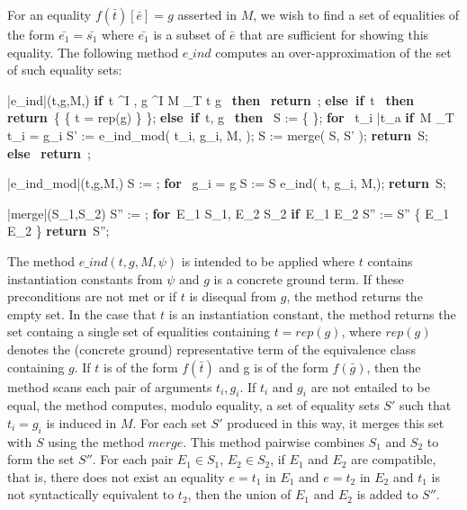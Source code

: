 \documentclass{llncs}
\def\IF{\qtab\keyword{if}\ }
\def\THEN{\ \keyword{then}\ }
\def\ELSE{\untab\qtab\keyword{else}\ }
\def\ELSEIF{\untab\qtab\keyword{else if}\ }
\def\FI{\untab}
\def\RETURN{\keyword{return}\ }
\def\ENDPROC{\untab}
\def\DOFOR{\qtab\keyword{for}\ }
\def\ENDFOR{\untab}
\def\keyword#1{\mbox{\normalshape\bf #1}}
\begin{document}
For an equality $f( \bar{t} )[\bar{e}] = g$ asserted in $M$, we wish to find a set of equalities of the form $\bar{e_1} = \bar{s_1}$ where $\bar{e_1}$ is a subset of $\bar{e}$ that are sufficient for showing this equality.
The following method $e\_ind$ computes an over-approximation of the set of such equality sets:

\begin{minipage}[t]{.4\linewidth}
\begin{program}
\PROC |e\_ind|(t,g,M,\psi) \BODY
  \IF t \not\mapsto^I \psi, g \not\mapsto^I \emptyset {} M \models_T t \neq g \THEN
    \RETURN \emptyset;
  \ELSEIF t  \THEN
    \RETURN \{ \{ t = rep(g) \} \};
  \ELSEIF t, g  \THEN
    S := \{ \emptyset \};
    \DOFOR {} t_i  \bar{t_a} 
      \IF M \not\models_T t_i = g_i
        S' := e\_ind\_mod( t_i, g_i, M, \psi );
        S := merge( S, S' );
      \FI
    \ENDFOR
    \RETURN S;
  \ELSE
    \RETURN \emptyset;
  \FI
\ENDPROC
\end{program}
\end{minipage}
\begin{minipage}[t]{.4\linewidth}
\begin{program}
\PROC |e\_ind\_mod|(t,g,M,\psi) \BODY
  S := \emptyset;
  \DOFOR {} g_i = g
    S := S \cup e\_ind( t, g_i, M,\psi );
  \ENDFOR
  \RETURN S;
\ENDPROC
\end{program}
\begin{program}
\PROC |merge|(S_1,S_2) \BODY
  S'' := \emptyset;
  \DOFOR E_1 \in S_1, E_2 \in S_2
    \IF E_1  E_2 
      S'' := S'' \cup \{ E_1 \cup E_2 \}
    \FI
  \ENDFOR
  \RETURN S'';
\ENDPROC
\end{program}
\end{minipage}

The method $e\_ind(t,g,M,\psi)$ is intended to be applied where $t$ contains instantiation constants from $\psi$ and $g$ is a concrete ground term.
If these preconditions are not met or if $t$ is disequal from $g$, the method returns the empty set.
In the case that $t$ is an instantiation constant, the method returns the set containg a single set of equalities containing $t = rep( g )$, where $rep( g )$ denotes the (concrete ground) representative term of the equivalence class containing $g$.
If $t$ is of the form $f(\bar{t})$ and g is of the form $f(\bar{g})$, then the method scans each pair of arguments $t_i, g_i$.
If $t_i$ and $g_i$ are not entailed to be equal, the method computes, modulo equality, a set of equality sets $S'$ such that $t_i = g_i$ is induced in $M$.
For each set $S'$ produced in this way, it merges this set with $S$ using the method $merge$.
This method pairwise combines $S_1$ and $S_2$ to form the set $S''$.
For each pair $E_1 \in S_1$, $E_2 \in S_2$, if $E_1$ and $E_2$ are compatible, that is, there does not exist an equality $e = t_1$ in $E_1$ and $e = t_2$ in $E_2$ and $t_1$ is not syntactically equivalent to $t_2$, then the union of $E_1$ and $E_2$ is added to $S''$.
\end{document}
